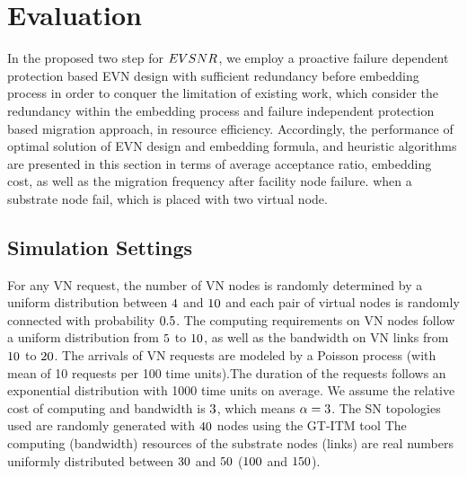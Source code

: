 
\section{Evaluation}
In the proposed two step for $EVSNR$, we employ a proactive failure dependent protection based EVN design with sufficient redundancy before embedding process in order to conquer the limitation of existing work, which consider the redundancy within
the embedding process and failure independent protection based migration approach, in resource efficiency. Accordingly, the performance of optimal solution of EVN design and embedding formula, and heuristic algorithms are presented in this section in terms of average acceptance ratio, embedding cost, as well as the migration frequency after facility node failure. when a substrate node fail, which is placed with two virtual node.


\subsection{Simulation Settings}
For any VN request, the number of VN nodes is randomly determined by a uniform distribution between $4$ and $10$ and each pair of virtual nodes is randomly connected with probability $0.5$. The computing requirements on VN nodes follow a uniform distribution from $5$ to $10$, as well as the bandwidth on VN links from $10$ to $20$. The arrivals of VN requests are modeled by a Poisson process (with mean of 10 requests per 100 time units).The duration of the requests follows an exponential distribution with 1000 time units on average.
We assume the relative cost of computing and bandwidth is $3$\cite{armbrust2009above,yu2010survivable}, which means $\alpha=3$. The SN topologies used are randomly generated with $40$ nodes using the GT-ITM tool\cite{zegura1996model} The computing
(bandwidth) resources of the substrate nodes (links) are real
numbers uniformly distributed between $30$ and $50$ ($100$ and
$150$).

